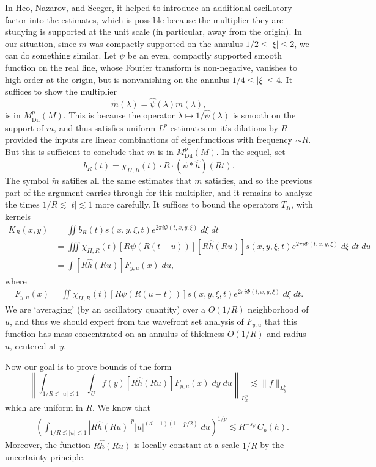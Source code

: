 In Heo, Nazarov, and Seeger, it helped to introduce an additional oscillatory factor into the estimates, which is possible because the multiplier they are studying is supported at the unit scale (in particular, away from the origin). In our situation, since $m$ was compactly supported on the annulus $1/2 \leq |\xi| \leq 2$, we can do something similar. Let $\psi$ be an even, compactly supported smooth function on the real line, whose Fourier transform is non-negative, vanishes to high order at the origin, but is nonvanishing on the annulus $1/4 \leq |\xi| \leq 4$. It suffices to show the multiplier
%
\[ \tilde{m}(\lambda) = \widehat{\psi}(\lambda) m(\lambda), \]
%
is in $M_{\text{Dil}}^p(M)$. This is because the operator $\lambda \mapsto 1/\widehat{\psi}(\lambda)$ is smooth on the support of $m$, and thus satisfies uniform $L^p$ estimates on it's dilations by $R$ provided the inputs are linear combinations of eigenfunctions with frequency $\sim R$. But this is sufficient to conclude that $m$ is in $M_{\text{Dil}}^p(M)$. In the sequel, set
%
\[ b_R(t) = \chi_{II,R}(t) \cdot R \cdot (\psi * \widehat{h})(Rt). \]
%
The symbol $\tilde{m}$ satifies all the same estimates that $m$ satisfies, and so the previous part of the argument carries through for this multiplier, and it remains to analyze the times $1/R \lesssim |t| \lesssim 1$ more carefully. It suffices to bound the operators $T_R$, with kernels
%
\begin{align*}
    K_R(x,y) &= \iint b_R(t) s(x,y,\xi,t) e^{2 \pi i \Phi(t,x,y,\xi)}\; d\xi\; dt\\
    &= \iiint \chi_{II,R}(t) [R \psi(R(t - u))] [R\widehat{h}(Ru)] s(x,y,\xi,t) e^{2 \pi i \Phi(t,x,y,\xi)}\; d\xi\; dt\; du\\
    &= \int [R \widehat{h}(Ru)] F_{y,u}(x)\; du,
\end{align*}
%
where
%
\begin{align*}
    F_{y,u}(x) = \iint \chi_{II,R}(t) [R \psi(R(u - t))] s(x,y,\xi,t) e^{2 \pi i \Phi(t,x,y,\xi)} \; d\xi\; dt.
\end{align*}
%
We are `averaging' (by an oscillatory quantity) over a $O(1/R)$ neighborhood of $u$, and thus we should expect from the wavefront set analysis of $F_{y,u}$ that this function has mass concentrated on an annulus of thickness $O(1/R)$ and radius $u$, centered at $y$.

Now our goal is to prove bounds of the form
%
\[ \left\| \int_{1/R \lesssim |u| \lesssim 1} \int_U f(y) [R \widehat{h}(Ru)] F_{y,u}(x)\; dy\; du \right\|_{L^p_x} \lesssim \| f \|_{L^p_y} \]
%
which are uniform in $R$. We know that
%
\begin{align*}
    &\left( \int_{1/R \lesssim |u| \lesssim 1} |R \widehat{h}(Ru)|^p |u|^{(d-1)(1-p/2)} \; du \right)^{1/p} \lesssim R^{-s_{p^*}} C_p(h).
\end{align*}
%
Moreover, the function $R \widehat{h}(Ru)$ is locally constant at a scale $1/R$ by the uncertainty principle.


